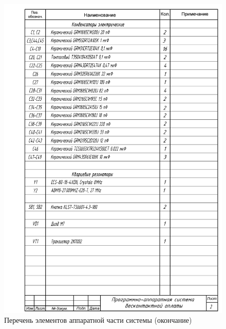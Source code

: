 \begin{figure}[H]
    \centering
    \includegraphics[height=0.95\textheight]{appendices/Спецификация Лист 2.jpg}
    \caption{Перечень элементов аппаратной части системы (окончание)}
\end{figure}

